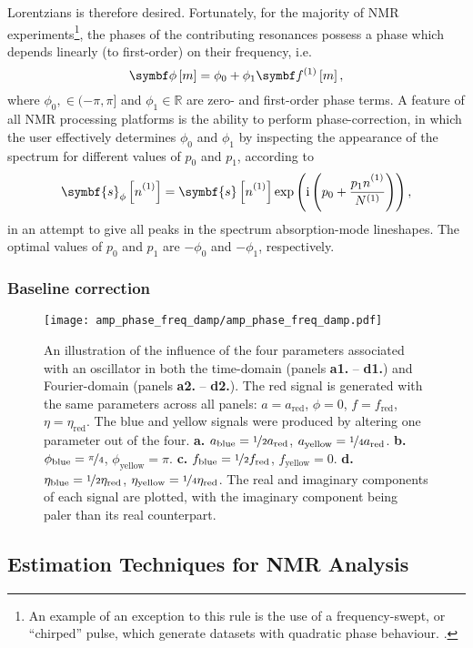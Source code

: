 Lorentzians is therefore desired. Fortunately, for the majority of \ac{NMR} experiments\footnote{
    An example of an exception to this rule is the use of a frequency-swept, or
    ``chirped'' pulse, which generate datasets with quadratic phase behaviour.
    .
}, the phases of the contributing resonances possess a phase which depends
linearly (to first-order) on their frequency, i.e.
\begin{equation}
    \bdphim = \phi_0 + \phi_1 \bdfonem,
\end{equation}
where $\phi_0, \in (-\pi, \pi]$ and $\phi_1 \in \mathbb{R}$ are zero- and
first-order phase terms. A feature of all \ac{NMR} processing platforms is the
ability to perform phase-correction, in which the user effectively determines
$\phi_0$ and $\phi_1$ by inspecting the appearance of the spectrum for
different values of $p_0$ and  $p_1$, according to
\begin{equation}
    \symbf{s}_{\phi} \left[\none\right] =
    \symbf{s} \left[\none\right]
    \exp\left(\iu \left(p_0 + \frac{p_1 \none}{\None}\right)\right),
\end{equation}
in an attempt to give all peaks in the spectrum absorption-mode lineshapes. The
optimal values of $p_0$ and  $p_1$ are $-\phi_0$ and  $-\phi_1$, respectively.

\subsubsection{Baseline correction}
\cite{Cobas2006}

\begin{figure}
    \centering
    \texttt{[image: amp\_phase\_freq\_damp/amp\_phase\_freq\_damp.pdf]}
    \caption[
        An illustration of the influence of the four parameters associated
        with an oscillator in both the time-domain nels and Fourier-domain.
    ]{
        An illustration of the influence of the four parameters associated
        with an oscillator in both the time-domain (panels \textbf{a1.} --
        \textbf{d1.}) and Fourier-domain (panels \textbf{a2.} -- \textbf{d2.}).
        The red signal is generated with the same parameters across all panels:
        $a = a_{\text{red}}$, $\phi = 0$, $f = f_{\text{red}}$,  $\eta =
        \eta_{\text{red}}$.  The blue and yellow signals were produced by
        altering one parameter out of the four.
        \textbf{a.}
        $a_{\text{blue}} = \nicefrac{1}{2} a_{\text{red}}$,
        $a_{\text{yellow}} = \nicefrac{1}{4} a_{\text{red}}$.
        \textbf{b.}
        $\phi_{\text{blue}} = \nicefrac{\pi}{4}$,
        $\phi_{\text{yellow}} = \pi$.
        \textbf{c.}
        $f_{\text{blue}} = \nicefrac{1}{2} f_{\text{red}}$,
        $f_{\text{yellow}} = 0$.
        \textbf{d.}
        $\eta_{\text{blue}} = \nicefrac{1}{2}\eta_{\text{red}}$,
        $\eta_{\text{yellow}} = \nicefrac{1}{4}\eta_{\text{red}}$.
        The real and imaginary components of each signal are plotted, with the
        imaginary component being paler than its real counterpart.
    }
    \label{fig:amp-phase-freq-damp}
\end{figure}
\subsection{Estimation Techniques for NMR Analysis}
